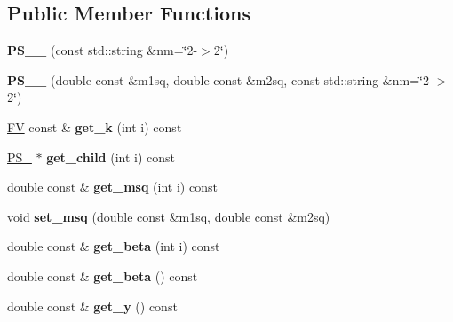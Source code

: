 \subsection*{Public Member Functions}
\begin{DoxyCompactItemize}
\item 
\hypertarget{classPS__2__2_a2c69fba98e2519e9247f8052b642dcdc}{{\bfseries P\-S\-\_\-\_} (const std\-::string \&nm=\char`\"{}2-\/$>$2\char`\"{})}\label{classPS__2__2_a2c69fba98e2519e9247f8052b642dcdc}

\item 
\hypertarget{classPS__2__2_a9656aed0fb1409f829f84f1c568ced85}{{\bfseries P\-S\-\_\-\_} (double const \&m1sq, double const \&m2sq, const std\-::string \&nm=\char`\"{}2-\/$>$2\char`\"{})}\label{classPS__2__2_a9656aed0fb1409f829f84f1c568ced85}

\item 
\hypertarget{classPS__2__2_a27f5570839ad56e039feb1b693c47fc4}{\hyperlink{classFV}{F\-V} const \& {\bfseries get\-\_\-k} (int i) const }\label{classPS__2__2_a27f5570839ad56e039feb1b693c47fc4}

\item 
\hypertarget{classPS__2__2_a75fb8afaac5a5feb3f914fd0bfbcc7b3}{\hyperlink{classPS__2}{P\-S\-\_} $\ast$ {\bfseries get\-\_\-child} (int i) const }\label{classPS__2__2_a75fb8afaac5a5feb3f914fd0bfbcc7b3}

\item 
\hypertarget{classPS__2__2_a038add35c67f07679dea7cb99831296c}{double const \& {\bfseries get\-\_\-msq} (int i) const }\label{classPS__2__2_a038add35c67f07679dea7cb99831296c}

\item 
\hypertarget{classPS__2__2_ae781b2b360acc3f902c91eef23ca1a80}{void {\bfseries set\-\_\-msq} (double const \&m1sq, double const \&m2sq)}\label{classPS__2__2_ae781b2b360acc3f902c91eef23ca1a80}

\item 
\hypertarget{classPS__2__2_a1fff415d89393fe3817d033ca94cddfc}{double const \& {\bfseries get\-\_\-beta} (int i) const }\label{classPS__2__2_a1fff415d89393fe3817d033ca94cddfc}

\item 
\hypertarget{classPS__2__2_accd43c9b6a1ad37cd7730ce42302b2f4}{double const \& {\bfseries get\-\_\-beta} () const }\label{classPS__2__2_accd43c9b6a1ad37cd7730ce42302b2f4}

\item 
\hypertarget{classPS__2__2_a31d25d54497c8dded3c57c117c59dbd6}{double const \& {\bfseries get\-\_\-y} () const }\label{classPS__2__2_a31d25d54497c8dded3c57c117c59dbd6}


\end{DoxyCompactItemize}
